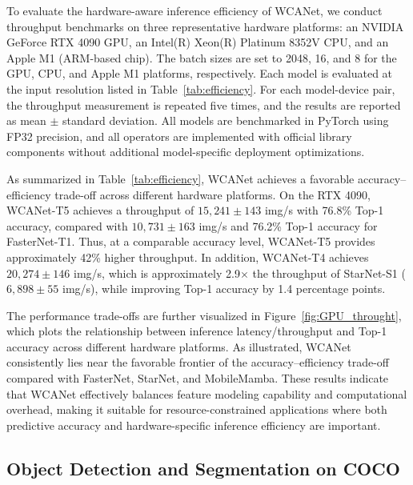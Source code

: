 \documentclass[a4paper,fleqn]{cas-dc}
\begin{document}
{ \color{green}
  To evaluate the hardware-aware inference efficiency of WCANet, we conduct throughput benchmarks on three representative hardware platforms: an NVIDIA GeForce RTX 4090 GPU, an Intel(R) Xeon(R) Platinum 8352V CPU, and an Apple M1 (ARM-based chip). The batch sizes are set to 2048, 16, and 8 for the GPU, CPU, and Apple M1 platforms, respectively. Each model is evaluated at the input resolution listed in Table~\ref{tab:efficiency}. For each model-device pair, the throughput measurement is repeated five times, and the results are reported as mean $\pm$ standard deviation. All models are benchmarked in PyTorch using FP32 precision, and all operators are implemented with official library components without additional model-specific deployment optimizations.

  As summarized in Table~\ref{tab:efficiency}, WCANet achieves a favorable accuracy--efficiency trade-off across different hardware platforms. On the RTX 4090, WCANet-T5 achieves a throughput of $15{,}241 \pm 143$ img/s with 76.8\% Top-1 accuracy, compared with $10{,}731 \pm 163$ img/s and 76.2\% Top-1 accuracy for FasterNet-T1. Thus, at a comparable accuracy level, WCANet-T5 provides approximately 42\% higher throughput. In addition, WCANet-T4 achieves $20{,}274 \pm 146$ img/s, which is approximately 2.9$\times$ the throughput of StarNet-S1 ($6{,}898 \pm 55$ img/s), while improving Top-1 accuracy by 1.4 percentage points.

  The performance trade-offs are further visualized in Figure~\ref{fig:GPU_throught}, which plots the relationship between inference latency/throughput and Top-1 accuracy across different hardware platforms. As illustrated, WCANet consistently lies near the favorable frontier of the accuracy--efficiency trade-off compared with FasterNet, StarNet, and MobileMamba. These results indicate that WCANet effectively balances feature modeling capability and computational overhead, making it suitable for resource-constrained applications where both predictive accuracy and hardware-specific inference efficiency are important.
}








\subsection{Object Detection and Segmentation on COCO}
\end{document}
